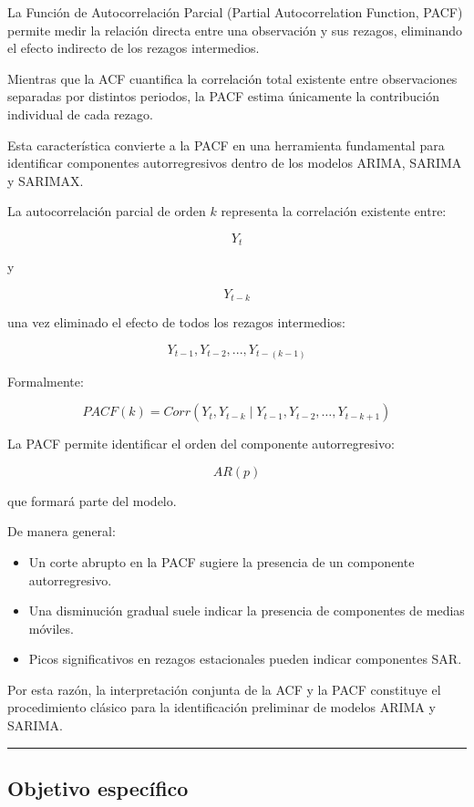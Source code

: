 \documentclass[11pt]{article}
\providecommand{\tightlist}{%
      \setlength{\itemsep}{0pt}\setlength{\parskip}{0pt}}
\begin{document}
La Función de Autocorrelación Parcial (Partial Autocorrelation Function,
PACF) permite medir la relación directa entre una observación y sus
rezagos, eliminando el efecto indirecto de los rezagos intermedios.

Mientras que la ACF cuantifica la correlación total existente entre
observaciones separadas por distintos periodos, la PACF estima
únicamente la contribución individual de cada rezago.

Esta característica convierte a la PACF en una herramienta fundamental
para identificar componentes autorregresivos dentro de los modelos
ARIMA, SARIMA y SARIMAX.

La autocorrelación parcial de orden \(k\) representa la correlación
existente entre:

\[
Y_t
\]

y

\[
Y_{t-k}
\]

una vez eliminado el efecto de todos los rezagos intermedios:

\[
Y_{t-1},Y_{t-2},...,Y_{t-(k-1)}
\]

Formalmente:

\[
PACF(k)
=
Corr
\left(
Y_t,
Y_{t-k}
\mid
Y_{t-1},
Y_{t-2},
\dots,
Y_{t-k+1}
\right)
\]

La PACF permite identificar el orden del componente autorregresivo:

\[
AR(p)
\]

que formará parte del modelo.

De manera general:

\begin{itemize}
\tightlist
\item
  Un corte abrupto en la PACF sugiere la presencia de un componente
  autorregresivo.
\item
  Una disminución gradual suele indicar la presencia de componentes de
  medias móviles.
\item
  Picos significativos en rezagos estacionales pueden indicar
  componentes SAR.
\end{itemize}

Por esta razón, la interpretación conjunta de la ACF y la PACF
constituye el procedimiento clásico para la identificación preliminar de
modelos ARIMA y SARIMA.

\begin{center}\rule{0.5\linewidth}{0.5pt}\end{center}

\hypertarget{objetivo-especuxedfico}{%
\subsection{Objetivo específico}\label{objetivo-especuxedfico}}
\end{document}
